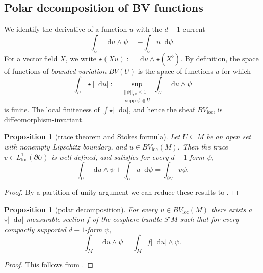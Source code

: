 \documentclass[reqno,10pt]{amsart}
\DeclareMathOperator{\supp}{supp}
\newcommand*\dif{\mathop{}\!\mathrm{d}}
\newcommand{\vol}{\mathrm{vol}}
\newcommand{\dfn}[1]{\emph{#1}\index{#1}}
\newcommand{\loc}{\mathrm{loc}}
\newtheorem{proposition}[theorem]{Proposition}
\theoremstyle{definition}
\numberwithin{equation}{section}
\begin{document}

\subsection{Polar decomposition of BV functions}
We identify the derivative of a function $u$ with the $d-1$-current
$$\int_U \dif u \wedge \psi = -\int_U u \dif \psi.$$
For a vector field $X$, we write $\star (Xu) := \dif u \wedge \star (X^\flat)$.
By definition, the space of functions of \dfn{bounded variation} $BV(U)$ is the space of functions $u$ for which
\begin{equation}\label{total variation}
\int_U \star |\dif u| := \sup_{\substack{||\psi||_{C^0} \leq 1\\\supp \psi \Subset U}} \int_U \dif u \wedge \psi
\end{equation}
is finite.
The local finiteness of $\int \star |\dif u|$, and hence the sheaf $BV_\loc$, is diffeomorphism-invariant.

\begin{proposition}[trace theorem and Stokes formula]
Let $U \subseteq M$ be an open set with nonempty Lipschitz boundary, and $u \in BV_\loc(M)$.
Then the trace $v \in L^1_\loc(\partial U)$ is well-defined,
and satisfies for every $d - 1$-form $\psi$,
\begin{equation}\label{Miranda IBP}
\int_U \dif u \wedge \psi + \int_U u \dif \psi = \int_{\partial U} v\psi.
\end{equation}
\end{proposition}
\begin{proof}
By a partition of unity argument we can reduce these results to \cite[Teorema 1]{Miranda67}.
\end{proof}

\begin{proposition}[polar decomposition]
For every $u \in BV_\loc(M)$ there exists a $\star |\dif u|$-measurable section $f$ of the cosphere bundle $S'M$ such that for every compactly supported $d-1$-form $\psi$,
\begin{equation}\label{RNy formula}
\int_M \dif u \wedge \psi = \int_M f|\dif u| \wedge \psi.
\end{equation}
\end{proposition}
\begin{proof}
This follows from \cite[Theorem 4.14]{simon1983GMT}.
\end{proof}
\end{document}
